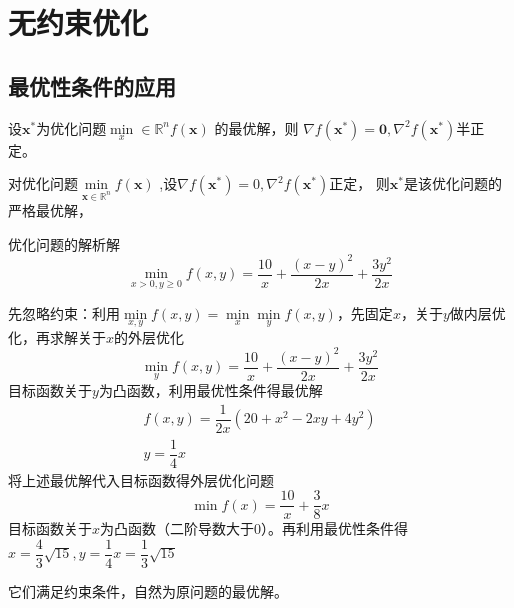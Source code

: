 \section{无约束优化}
\subsection{最优性条件的应用}
\begin{theorem}
    设$\boldsymbol{x}^*$为优化问题$\min\limits_x\in\mathbb{R}^nf(\boldsymbol{x})$ 的最优解，则 $\nabla f(\boldsymbol{x}^*)=\mathbf{0},\nabla^2f(\boldsymbol{x}^*)$半正定。
\end{theorem}
\begin{theorem}
    对优化问题$\min\limits_{\boldsymbol{x}\in\mathbb{R}^n}f(\boldsymbol{x})$ ,设$\nabla f(\boldsymbol{x}^*)=0,\nabla^2f(\boldsymbol{x}^*)$正定，
则$\boldsymbol{x}^*$是该优化问题的严格最优解，
\end{theorem}
\begin{example}
    优化问题的解析解
    \[
        \min\limits_{x>0,y\geqslant 0}f(x,y)=\dfrac{10}{x}+\dfrac{(x-y)^{2}}{2x}+\dfrac{3y^{2}}{2x}
    \]
    \begin{solution}
        先忽略约束：利用$\min\limits_{x,y}f(x,y)=\min\limits_x\min\limits_yf(x,y)$，先固定$x$，关于$y$做内层优化，再求解关于$x$的外层优化
        \[
            \min\limits_{y}f(x,y)=\frac{10}{x}+\frac{(x-y)^{2}}{2x}+\frac{3y^{2}}{2x}
        \]
        目标函数关于$y$为凸函数，利用最优性条件得最优解
        \[
            \begin{array}{c}
                f(x,y)=\dfrac{1}{2x}\left( 20+x^2-2xy+4y^2 \right)\\
                y = \dfrac{1}{4}x
            \end{array}
        \]
        将上述最优解代入目标函数得外层优化问题
        \[
            \min f(x)=\dfrac{10}{x}+\dfrac{3}{8}x
        \]
        目标函数关于$x$为凸函数（二阶导数大于0）。再利用最优性条件得$x=\dfrac43\sqrt{15},y=\dfrac{1}{4}x=\dfrac{1}{3}\sqrt{15}$

        它们满足约束条件，自然为原问题的最优解。
    \end{solution}
\end{example}
